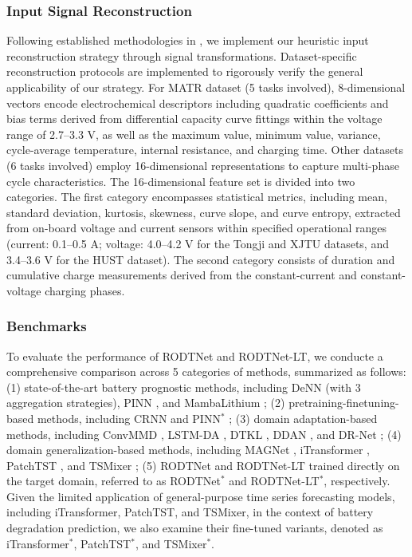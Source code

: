 \documentclass[lettersize,journal]{IEEEtran}
\begin{document}
\subsubsection{Input Signal Reconstruction}

Following established methodologies in \cite{10251604,wang2024physics}, we implement our heuristic input reconstruction strategy through signal transformations. Dataset-specific reconstruction protocols are implemented to rigorously verify the general applicability of our strategy. For MATR dataset (5 tasks involved), 8-dimensional vectors encode electrochemical descriptors including quadratic coefficients and bias terms derived from differential capacity curve fittings within the voltage range of 2.7–3.3 V, as well as the maximum value, minimum value, variance, cycle-average temperature, internal resistance, and charging time. Other datasets (6 tasks involved) employ 16-dimensional representations to capture multi-phase cycle characteristics. The 16-dimensional feature set is divided into two categories. The first category encompasses statistical metrics, including mean, standard deviation, kurtosis, skewness, curve slope, and curve entropy, extracted from on-board voltage and current sensors within specified operational ranges (current: 0.1–0.5 A; voltage: 4.0–4.2 V for the Tongji and XJTU datasets, and 3.4–3.6 V for the HUST dataset). The second category consists of duration and cumulative charge measurements derived from the constant-current and constant-voltage charging phases.

\subsubsection{Benchmarks}

To evaluate the performance of RODTNet and RODTNet-LT, we conducte a comprehensive comparison across 5 categories of methods, summarized as follows:
% 
(1) state-of-the-art battery prognostic methods, including DeNN \cite{10102497} (with 3 aggregation strategies), PINN \cite{wang2024physics}, and MambaLithium \cite{shi2024mambalithiumselectivestatespace};
(2) pretraining-finetuning-based methods, including CRNN \cite{D2EE01676A} and PINN$^\ast$ \cite{wang2024physics};
(3) domain adaptation-based methods, including ConvMMD \cite{9788003}, LSTM-DA \cite{HAN2022230823}, DTKL \cite{10029904}, DDAN \cite{9560040}, and DR-Net \cite{WANG2023108897};
(4) domain generalization-based methods, including MAGNet \cite{TAN2024103725}, iTransformer \cite{liu2024itransformer}, PatchTST \cite{nie2023a}, and TSMixer \cite{chen2023tsmixer};
(5) RODTNet and RODTNet-LT trained directly on the target domain, referred to as RODTNet$^\ast$ and RODTNet-LT$^\ast$, respectively.
% 
Given the limited application of general-purpose time series forecasting models, including iTransformer, PatchTST, and TSMixer, in the context of battery degradation prediction, we also examine their fine-tuned variants, denoted as iTransformer$^\ast$, PatchTST$^\ast$, and TSMixer$^\ast$.
\end{document}
